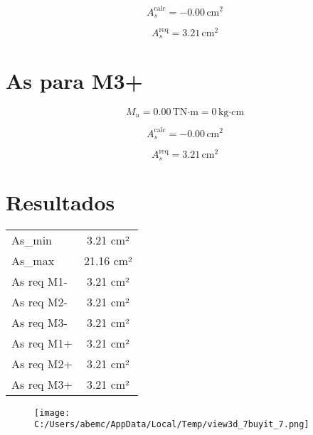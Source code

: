 \documentclass[12pt]{article}
\begin{document}
\[
A_s^{\text{calc}} = -0.00\,\text{cm}^2
\]

\[
A_s^{\text{req}} = 3.21\,\text{cm}^2
\]

\vspace{0.5cm}

\section*{ As para M3+ }

\[
M_u = 0.00\,\text{TN·m} = 0\,\text{kg·cm}
\]

\[
A_s^{\text{calc}} = -0.00\,\text{cm}^2
\]

\[
A_s^{\text{req}} = 3.21\,\text{cm}^2
\]

\vspace{0.5cm}



\section*{Resultados}
\begin{tabular}{|l|c|}
\hline

As_min & 3.21 cm² \\

As_max & 21.16 cm² \\

As req M1- & 3.21 cm² \\

As req M2- & 3.21 cm² \\

As req M3- & 3.21 cm² \\

As req M1+ & 3.21 cm² \\

As req M2+ & 3.21 cm² \\

As req M3+ & 3.21 cm² \\

\hline
\end{tabular}



\begin{figure}[H]
\centering
\texttt{[image: C:/Users/abemc/AppData/Local/Temp/view3d\_7buyit\_7.png]}
\end{figure}
\end{document}
